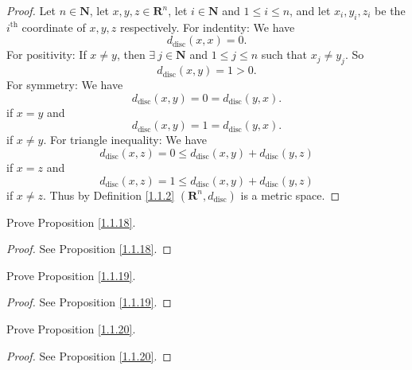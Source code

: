 \begin{proof}
    Let \(n \in \mathbf{N}\), let \(x, y, z \in \mathbf{R}^n\), let \(i \in \mathbf{N}\) and \(1 \leq i \leq n\), and let \(x_i, y_i, z_i\) be the \(i^{\text{th}}\) coordinate of \(x, y, z\) respectively.
    For indentity:
    We have
    \[
        d_{\text{disc}}(x, x) = 0.
    \]
    For positivity:
    If \(x \neq y\), then \(\exists\ j \in \mathbf{N}\) and \(1 \leq j \leq n\) such that \(x_j \neq y_j\).
    So
    \[
        d_{\text{disc}}(x, y) = 1 > 0.
    \]
    For symmetry:
    We have
    \[
        d_{\text{disc}}(x, y) = 0 = d_{\text{disc}}(y, x).
    \]
    if \(x = y\) and
    \[
        d_{\text{disc}}(x, y) = 1 = d_{\text{disc}}(y, x).
    \]
    if \(x \neq y\).
    For triangle inequality:
    We have
    \[
        d_{\text{disc}}(x, z) = 0 \leq d_{\text{disc}}(x, y) + d_{\text{disc}}(y, z)
    \]
    if \(x = z\) and
    \[
        d_{\text{disc}}(x, z) = 1 \leq d_{\text{disc}}(x, y) + d_{\text{disc}}(y, z)
    \]
    if \(x \neq z\).
    Thus by Definition \ref{1.1.2} \((\mathbf{R}^n, d_{\text{disc}})\) is a metric space.
\end{proof}

\begin{exercise}\label{ex 1.1.12}
    Prove Proposition \ref{1.1.18}.
\end{exercise}

\begin{proof}
    See Proposition \ref{1.1.18}.
\end{proof}

\begin{exercise}\label{ex 1.1.13}
    Prove Proposition \ref{1.1.19}.
\end{exercise}

\begin{proof}
    See Proposition \ref{1.1.19}.
\end{proof}

\begin{exercise}\label{ex 1.1.14}
    Prove Proposition \ref{1.1.20}.
\end{exercise}

\begin{proof}
    See Proposition \ref{1.1.20}.
\end{proof}

